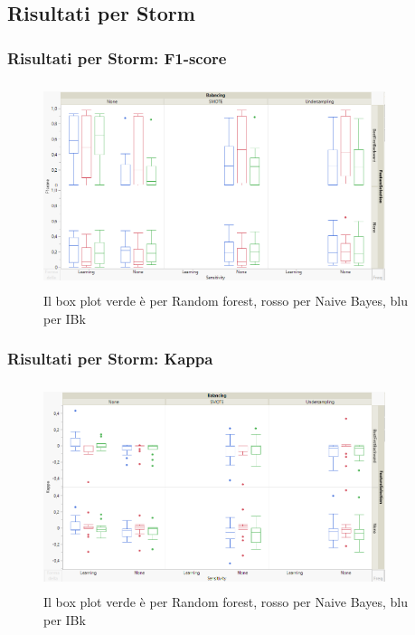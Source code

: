 \documentclass{beamer}
\begin{document}
\subsection{Risultati per Storm}
\begin{frame}
	\frametitle{Risultati per Storm: F1-score}
	
	\centering
	\begin{figure}
	\includegraphics[width=10cm, height=6cm]{storm-f1score}
	\caption{Il box plot verde è per Random forest, rosso per Naive Bayes, blu per IBk}
	\end{figure}
\end{frame}

\begin{frame}
	\frametitle{Risultati per Storm: Kappa}
	
	\centering
	\begin{figure}
	\includegraphics[width=10cm, height=6cm]{storm-kappa}
	\caption{Il box plot verde è per Random forest, rosso per Naive Bayes, blu per IBk}
	\end{figure}
\end{frame}
\end{document}
